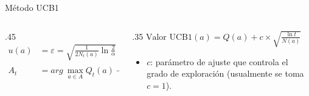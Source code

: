 \documentclass[10pt, envcountsect, handout, aspectratio=1610, hyperref={hypertexnames=true}]{beamer}
\begin{document}
\begin{frame}{Método UCB1}
\begin{itemize}
\begin{columns}
\begin{column}{.45\textwidth}
\begin{align*}
u(a) & = \varepsilon =  \sqrt {\frac {1} {2N_t(a)} \ln {\frac {2} {\alpha}}} = \sqrt {\frac {1} {2N_t(a)} \ln {t^4}} = \sqrt {\frac {2 \ln{t} } {N_t(a)} } \\
A_t  & = arg\ \max_{a\in A} Q_t(a) + \sqrt {\frac {2 \ln{t} } {N_t(a)}}
\end{align*}
\end{column}

\begin{column}{.35\textwidth}
$ \text{Valor UCB1}(a) = Q(a) + c \times \sqrt{\frac{\ln t}{N(a)}} $
\begin{itemize}
        \item \( c \): parámetro de ajuste que controla el grado de exploración (usualmente se toma \( c = 1 \)).
\end{itemize}

~

\end{column}
\end{columns}
\end{itemize}
\end{frame}





\end{document}
